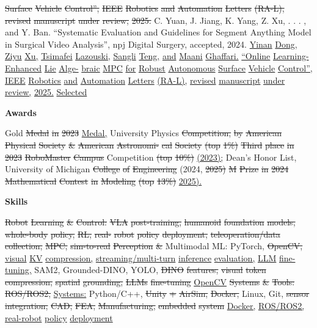 \documentclass[10pt,letterpaper]{article}
\newcommand{\del}[1]{{\color{red}\sout{#1}}}
\newcommand{\add}[1]{{\color{blue}\uline{#1}}}
\begin{document}
\del{Surface} \del{Vehicle} \del{Control'',} \del{IEEE} \del{Robotics} \del{and} \del{Automation} \del{Letters} \del{(RA-L),} \del{revised} \del{manuscript} \del{under} \del{review,} \del{2025.}  C. Yuan, J. Jiang, K. Yang, Z. Xu, . . . , and Y. Ban. ``Systematic Evaluation and Guidelines for Segment Anything Model in Surgical Video Analysis'', npj Digital Surgery, accepted, 2024. \add{} \add{Yinan} \add{Dong,} \add{Ziyu} \add{Xu,} \add{Tsimafei} \add{Lazouski,} \add{Sangli} \add{Teng,} \add{and} \add{Maani} \add{Ghaffari.} \add{``Online} \add{Learning-Enhanced} \add{Lie} \add{Alge-} \add{braic} \add{MPC} \add{for} \add{Robust} \add{Autonomous} \add{Surface} \add{Vehicle} \add{Control'',} \add{IEEE} \add{Robotics} \add{and} \add{Automation} \add{Letters} \add{(RA-L),} \add{revised} \add{manuscript} \add{under} \add{review,} \add{2025.} \add{Selected} \par\medskip\textbf{Awards}\par  \del{} Gold \del{Medal} \del{in} \del{2023} \add{Medal,} University Physics \del{Competition,} \del{by} \del{American} \del{Physical} \del{Society} \del{\&} \del{American} \del{Astronomi-} \del{cal} \del{Society} \del{(top} \del{1\%)} \del{} \del{Third} \del{place} \del{in} \del{2023} \del{RoboMaster} \del{Campus} Competition \del{(top} \del{10\%)} \del{} \add{(2023);} Dean's Honor List, University of Michigan \del{College} \del{of} \del{Engineering} (2024, \del{2025)} \del{} \del{M} \del{Prize} \del{in} \del{2024} \del{Mathematical} \del{Contest} \del{in} \del{Modeling} \del{(top} \del{13\%)} \add{2025).} \par\medskip\textbf{Skills}\par   \del{Robot} \del{Learning} \del{\&} \del{Control:} \del{VLA} \del{post-training,} \del{humanoid} \del{foundation} \del{models,} \del{whole-body} \del{policy,} \del{RL,} \del{real-} \del{robot} \del{policy} \del{deployment,} \del{teleoperation/data} \del{collection,} \del{MPC,} \del{sim-to-real} \del{} \del{Perception} \del{\&} Multimodal ML: PyTorch, \del{OpenCV,} \add{visual} \add{KV} \add{compression,} \add{streaming/multi-turn} \add{inference} \add{evaluation,} \add{LLM} \add{fine-tuning,} SAM2, Grounded-DINO, YOLO, \del{DINO} \del{features,} \del{visual} \del{token} \del{compression,} \del{spatial} \del{grounding,} \del{LLMs} \del{fine-tuning} \add{OpenCV}  \del{Systems} \del{\&} \del{Tools:} \del{ROS/ROS2,} \add{Systems:} Python/C++, \del{Unity} \del{+} \del{AirSim,} \del{Docker,} Linux, Git, \del{sensor} \del{integration,} \del{CAD,} \del{FEA,} \del{Manufacturing,} \del{embedded} \del{system} \add{Docker,} \add{ROS/ROS2,} \add{real-robot} \add{policy} \add{deployment}\end{document}
\end{document}
